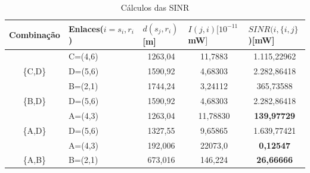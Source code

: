 \begin{table}[H]
\centering
\caption{Cálculos das SINR}
\label{table:sinr}
\begin{tabular}{|c|l|c|c|c|}
\hline
\multicolumn{1}{|l|}{Combinação} & Enlaces($i=s_i,r_i$) & \multicolumn{1}{l|}{$d(s_j,r_i)${[}m{]}} & \multicolumn{1}{l|}{$I(j,i)[10^{-11}$mW$]$} & \multicolumn{1}{l|}{$SINR(i, \{i,j\}$){[}mW{]}} \\ \hline
                                 & C=(4,6)          & 1263,04                              & 11,7883                                  & \cellcolor[HTML]{9AFF99}1.115,22962           \\ \cline{2-5} 
\multirow{-2}{*}{\{C,D\}}        & D=(5,6)          & 1590,92                              & 4,68303                                  & \cellcolor[HTML]{9AFF99}2.282,86418           \\ \hline
                                 & B=(2,1)          & 1744,24                              & 3,24112                                  & \cellcolor[HTML]{9AFF99}365,73588             \\ \cline{2-5} 
\multirow{-2}{*}{\{B,D\}}        & D=(5,6)          & 1590,92                              & 4,68303                                  & \cellcolor[HTML]{9AFF99}2.282,86418           \\ \hline
                                 & A=(4,3)          & 1263,04                              & 11,78830                                 & \cellcolor[HTML]{FFCCC9}\textbf{139,97729}    \\ \cline{2-5} 
\multirow{-2}{*}{\{A,D\}}        & D=(5,6)          & 1327,55                              & 9,65865                                  & \cellcolor[HTML]{9AFF99}1.639,77421           \\ \hline
                                 & A=(4,3)          & 192,006                              & 22073,0                                  & \cellcolor[HTML]{FFCCC9}\textbf{0,12547}      \\ \cline{2-5} 
\multirow{-2}{*}{\{A,B\}}        & B=(2,1)          & 673,016                              & 146,224                                  & \cellcolor[HTML]{FFCCC9}\textbf{26,66666}     \\ \hline
\end{tabular}
\end{table}

